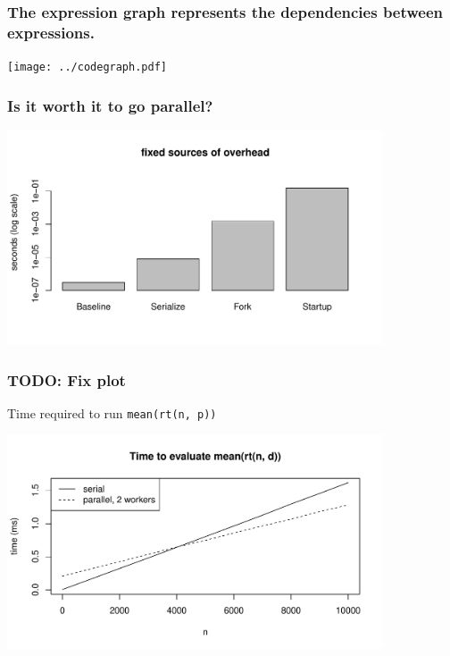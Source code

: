 \documentclass{beamer}
\begin{document}
\begin{frame}

    \frametitle{The expression graph represents the dependencies between
    expressions.}

    \centerline{\texttt{[image: ../codegraph.pdf]}}

\end{frame}
\begin{frame}


\frametitle{Is it worth it to go parallel?}

    \centerline{\includegraphics[height=2.5in]{../compute_times/overhead}}




\end{frame}
\begin{frame}[fragile]

\frametitle{TODO: Fix plot}

Time required to run \texttt{mean(rt(n, p))}

\centerline{\includegraphics[height=2.5in]{../compute_times/ser_vs_par.pdf}}

\end{frame}
\end{document}

